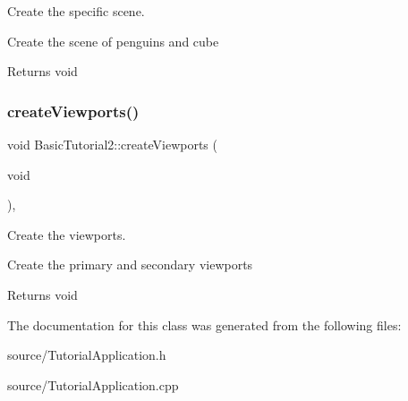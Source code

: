 Create the specific scene. 

Create the scene of penguins and cube

\begin{DoxyReturn}{Returns}
void 
\end{DoxyReturn}
\hypertarget{class_basic_tutorial2_afb03154c0535bf45f5c3207ddabd4cc5}{}\label{class_basic_tutorial2_afb03154c0535bf45f5c3207ddabd4cc5} 
\subsubsection{\texorpdfstring{create\+Viewports()}{createViewports()}}
{\footnotesize\ttfamily void Basic\+Tutorial2\+::create\+Viewports (\begin{DoxyParamCaption}\item[{void}]{ }\end{DoxyParamCaption})\hspace{0.3cm}{\ttfamily [protected]}, {\ttfamily [virtual]}}



Create the viewports. 

Create the primary and secondary viewports

\begin{DoxyReturn}{Returns}
void 
\end{DoxyReturn}


The documentation for this class was generated from the following files\+:\begin{DoxyCompactItemize}
\item 
source/Tutorial\+Application.\+h\item 
source/Tutorial\+Application.\+cpp\end{DoxyCompactItemize}
